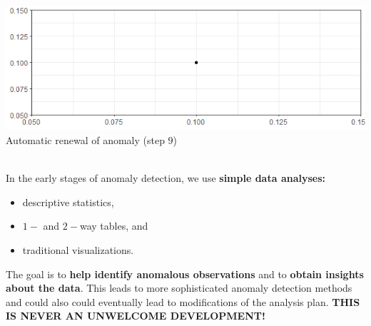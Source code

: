 \documentclass[20pt,landscape,footrule,headrule]{foils}
\newcommand{\newl}{\newline\newline}
\begin{document}
\newpage\ \\ 
\begin{center}
\includegraphics[width=\textwidth]{Images/ADOA10.png}\\ Automatic renewal of anomaly (step $9$)
\end{center}
\newpage\ \\ \noindent In the early stages of anomaly detection, we use \textbf{simple data analyses:}
\begin{itemize}
\item descriptive statistics, 
\item $1-$ and $2-$way tables, and  
\item traditional  visualizations.
\end{itemize}
The goal is to \textbf{help identify anomalous observations} and to \textbf{obtain insights about the data}.
\newl 
This leads to more sophisticated anomaly detection methods and could also could eventually lead to modifications of the analysis plan. 
\newl \textbf{THIS IS NEVER AN UNWELCOME DEVELOPMENT!}
\end{document}

